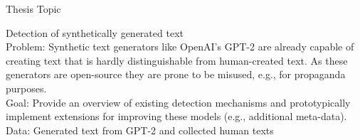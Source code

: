Thesis Topic

Detection of synthetically generated text \\
Problem: Synthetic text generators like OpenAI’s GPT-2 are already capable of creating text that is hardly distinguishable from human-created text. As these generators are open-source they are prone to be misused, e.g., for propaganda purposes. \\
Goal: Provide an overview of existing detection mechanisms and prototypically implement extensions for improving these models (e.g., additional meta-data). \\
Data: Generated text from GPT-2 and collected human texts